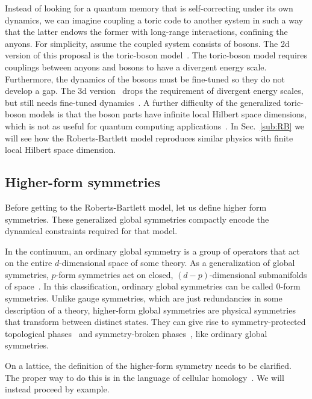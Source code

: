 Instead of looking for a quantum memory that is self-correcting under its own dynamics, we can imagine coupling a toric code to another system in such a way that the latter endows the former with long-range interactions, confining the anyons. For simplicity, assume the coupled system consists of bosons. The 2d version of this proposal is the toric-boson model~\cite{Hamma2009Toric}. The toric-boson model requires couplings between anyons and bosons to have a divergent energy scale. Furthermore, the dynamics of the bosons must be fine-tuned so they do not develop a gap. The 3d version~\cite{Pedrocchi2013Thermal} drops the requirement of divergent energy scales, but still needs fine-tuned dynamics~\cite{LandonCardinal2015}. A further difficulty of the generalized toric-boson models is that the boson parts have infinite local Hilbert space dimensions, which is not as useful for quantum computing applications~\cite{Brown2016Finite}. In Sec.~\ref{sub:RB} we will see how the Roberts-Bartlett model reproduces similar physics with finite local Hilbert space dimension.

\subsection{Higher-form symmetries} \label{sub:higher}

Before getting to the Roberts-Bartlett model, let us define higher form symmetries. These generalized global symmetries compactly encode the dynamical constraints required for that model.

In the continuum, an ordinary global symmetry is a group of operators that act on the entire $d$-dimensional space of some theory. As a generalization of global symmetries, $p$-form symmetries act on closed, $(d-p)$-dimensional submanifolds of space~\cite{Gaiotto2015Generalized, Lake2018Higher}. In this classification, ordinary global symmetries can be called 0-form symmetries. Unlike gauge symmetries, which are just redundancies in some description of a theory, higher-form global symmetries are physical symmetries that transform between distinct states. They can give rise to symmetry-protected topological phases~\cite{Gaiotto2015Generalized} and symmetry-broken phases~\cite{Gaiotto2015Generalized, Lake2018Higher, Wen2019Higher}, like ordinary global symmetries. 

On a lattice, the definition of the higher-form symmetry needs to be clarified. The proper way to do this is in the language of cellular homology~\cite{Qi2021Exotic}.  We will instead proceed by example.

